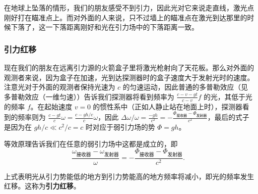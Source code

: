 在地球上坠落的情形，我们的朋友感受不到引力，因此光对它来说走直线，激光点刚好打在瞄准点上。而对外面的人来说，只不过墙上的瞄准点在激光到达那里的时候下落了，这一下落距离刚好和光在引力场中的下落距离一致。

\subsubsection{引力红移}
现在我们的朋友在远离引力源的火箭盒子里将激光枪射向了天花板。那么对外面的观测者来说，因为盒子在加速，光到达探测器时的盒子速度大于发射光时的速度。注意光对于外面的观测者保持光速为 $c$ 的匀速运动，因此普通的多普勒效应（见多普勒效应（一维匀速））告诉我们探测器将看到频率为 $\frac{c-v-gt}{c-v}f$ 的光，其低于光的频率 $f$。在起始速度 $v=0$ 的惯性系中（正如人静止站在地面上时），探测器看到的频率则为 $\frac{c-gt}{c}\omega=\frac{c-gh/c}{c}\omega$，因此
$\Delta \omega/\omega=\frac{-gh}{c^2}=-\frac{\Phi_{\text{接收器}}-\Phi_{\text{发射器}}}{c^2}$，最后的式子是因为在 $gh/c\ll c^2/c=c$ 时对应于弱引力场的势 $\Phi=gh$。

等效原理告诉我们在任意的弱引力场中这都是成立的，即
\begin{equation}
\frac{\omega_{\text{接收器}}-\omega_{\text{发射器}}}{\omega}=-\frac{\Phi_{\text{接收器}}-\Phi_{\text{发射器}}}{c^2}.~
\end{equation}

上式表明光从引力势能低的地方到引力势能高的地方频率将减小，即光的频率发生红移。这称为\textbf{引力红移}。




